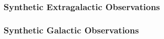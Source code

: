 

\vspace{-3mm}
\subsubsection{Synthetic Extragalactic Observations}
\vspace{-2mm}


\vspace{-3mm}
\subsubsection{Synthetic Galactic Observations}
\vspace{-2mm}


